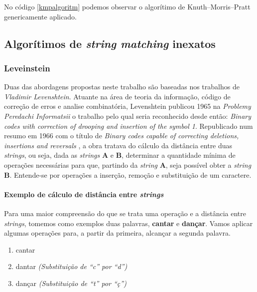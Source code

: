 No código \ref{kmpalgoritm} podemos observar o algorítimo de Knuth–Morris–Pratt genericamente aplicado.


\subsection{Algorítimos de \textit{string matching} inexatos} %

\subsubsection*{Leveinstein} %
\label{sec:leveinstein}

Duas das abordagens propostas neste trabalho são baseadas nos trabalhos de \textit{Vladimir Levenshtein}. Atuante na área de teoria da informação, código de correção de erros e analise combinatória, Levenshtein publicou 1965 na \textit{Problemy Peredachi Informatsii} o trabalho pelo qual seria reconhecido desde então: \textit{Binary codes with correction of drooping and insertion of the symbol 1}\cite{levenshtein1965}. Republicado num resumo em 1966 com o título de \textit{Binary codes capable of correcting deletions, insertions and reversals} \cite{levenshtein1966}, a obra tratava do cálculo da distância entre duas \textit{strings}, ou seja, dada as \textit{strings} \textbf{A} e \textbf{B}, determinar a quantidade mínima de operações necessárias para que, partindo da \textit{string} \textbf{A}, seja possível obter a \textit{string} \textbf{B}. Entende-se por operações a inserção, remoção e substituição de um caractere.

\paragraph*{Exemplo de cálculo de distância entre \textit{strings}} %
\label{sub:exemplo_de_c_lculo_de_distancia_entre_it}

Para uma maior compreensão do que se trata uma operação e a distância entre \textit{strings}, tomemos como exemplos duas palavras, \textbf{cantar} e \textbf{dançar}. Vamos aplicar algumas operações para, a partir da primeira, alcançar a segunda palavra.


\begin{enumerate}[start=0]
	\item cantar
	\item dantar \textit{(Substituição de ``c'' por ``d'')}
	\item dançar \textit{(Substituição de ``t'' por ``ç'')}
\end{enumerate}

